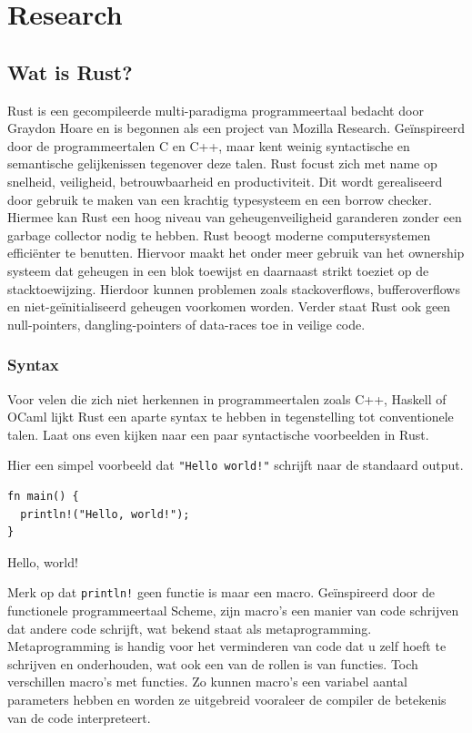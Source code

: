 \chapter{Research}

\section{Wat is Rust?}

Rust is een gecompileerde multi-paradigma programmeertaal bedacht door Graydon Hoare en is begonnen
als een project van Mozilla Research. Geïnspireerd door de programmeertalen C en C++, maar kent
weinig syntactische en semantische gelijkenissen tegenover deze talen. Rust focust zich met name op
snelheid, veiligheid, betrouwbaarheid en productiviteit. Dit wordt gerealiseerd door gebruik te
maken van een krachtig typesysteem en een borrow checker. Hiermee kan Rust een hoog niveau van
geheugenveiligheid garanderen zonder een garbage collector nodig te hebben. Rust beoogt moderne
computersystemen efficiënter te benutten. Hiervoor maakt het onder meer gebruik van het ownership
systeem dat geheugen in een blok toewijst en daarnaast strikt toeziet op de stacktoewijzing.
Hierdoor kunnen problemen zoals stackoverflows, bufferoverflows en niet-geïnitialiseerd geheugen
voorkomen worden. Verder staat Rust ook geen null-pointers, dangling-pointers of data-races toe in
veilige code.

\subsection{Syntax} 

Voor velen die zich niet herkennen in programmeertalen zoals C++, Haskell of OCaml lijkt Rust een
aparte syntax te hebben in tegenstelling tot conventionele talen. Laat ons even kijken naar een paar
syntactische voorbeelden in Rust.


Hier een simpel voorbeeld dat \texttt{"Hello world!"} schrijft naar de standaard output.

\begin{listing}[h]
\begin{verbatim}
fn main() {
  println!("Hello, world!");
}
\end{verbatim}
\caption{Hello, world!}
\end{listing}

\clearpage

Merk op dat \texttt{println!} geen functie is maar een macro. Geïnspireerd door de
functionele programmeertaal Scheme, zijn macro’s een manier van code schrijven dat andere code
schrijft, wat bekend staat als metaprogramming. Metaprogramming is handig voor het verminderen van
code dat u zelf hoeft te schrijven en onderhouden, wat ook een van de rollen is van functies. Toch
verschillen macro’s met functies. Zo kunnen macro’s een variabel aantal parameters hebben en worden
ze uitgebreid vooraleer de compiler de betekenis van de code interpreteert.

